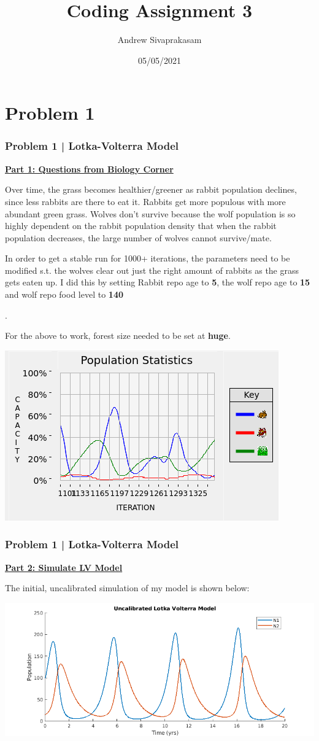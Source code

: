 \documentclass[aspectratio=1610]{beamer}
\title{Coding Assignment 3}
\author[Andrew Sivaprakasam]{Andrew Sivaprakasam}
\date{05/05/2021}
\begin{document}
\frame{\titlepage}

\section{Problem 1}

\begin{frame}
\frametitle{Problem 1 | Lotka-Volterra Model}
\textbf{\underline{Part 1: Questions from Biology Corner}}
\begin{enumerate}
\item \footnotesize{Over time, the grass becomes healthier/greener as rabbit population declines, since less rabbits are there to eat it. Rabbits get more populous with more abundant green grass. Wolves don't survive because the wolf population is so highly dependent on the rabbit population density that when the rabbit population decreases, the large number of wolves cannot survive/mate. 
\item In order to get a stable run for 1000+ iterations, the parameters need to be modified s.t. the wolves clear out just the right amount of rabbits as the grass gets eaten up. I did this by setting Rabbit repo age to \textbf{5}, the wolf repo age to \textbf{15} and wolf repo food level to \textbf{140}}.

\item For the above to work, forest size needed to be set at \textbf{huge}.

\vspace{1em}
\centering
\includegraphics[width = .45\textwidth]{sim_1000} 
\end{enumerate}
\end{frame}


\begin{frame}
\frametitle{Problem 1 | Lotka-Volterra Model}
\textbf{\underline{Part 2: Simulate LV Model}}
\vspace{1em}

The initial, uncalibrated simulation of my model is shown below:
\vspace{.5em}

\centering
\includegraphics[width = .9\textwidth]{LV_uncalib}

\end{frame}
\end{document}
